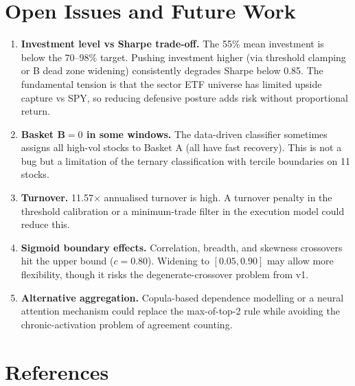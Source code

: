 \documentclass[11pt,a4paper]{article}
\begin{document}
\section{Open Issues and Future Work}

\begin{enumerate}
  \item \textbf{Investment level vs Sharpe trade-off.} The 55\% mean investment is below the 70--98\% target. Pushing investment higher (via threshold clamping or B dead zone widening) consistently degrades Sharpe below 0.85. The fundamental tension is that the sector ETF universe has limited upside capture vs SPY, so reducing defensive posture adds risk without proportional return.

  \item \textbf{Basket B$=0$ in some windows.} The data-driven classifier sometimes assigns all high-vol stocks to Basket A (all have fast recovery). This is not a bug but a limitation of the ternary classification with tercile boundaries on 11 stocks.

  \item \textbf{Turnover.} 11.57$\times$ annualised turnover is high. A turnover penalty in the threshold calibration or a minimum-trade filter in the execution model could reduce this.

  \item \textbf{Sigmoid boundary effects.} Correlation, breadth, and skewness crossovers hit the upper bound ($c = 0.80$). Widening to $[0.05, 0.90]$ may allow more flexibility, though it risks the degenerate-crossover problem from v1.

  \item \textbf{Alternative aggregation.} Copula-based dependence modelling or a neural attention mechanism could replace the max-of-top-2 rule while avoiding the chronic-activation problem of agreement counting.
\end{enumerate}

\section{References}
\end{document}
